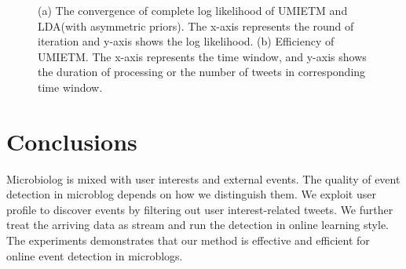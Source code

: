 \documentclass[runningheads,a4paper]{llncs}
\begin{document}
\begin{figure}
        \centering
        \caption{(a) The convergence of complete log likelihood of UMIETM and LDA(with asymmetric priors). The x-axis represents the round of iteration and y-axis shows the log likelihood. (b) Efficiency of UMIETM. The x-axis represents the time window, and y-axis shows the duration of processing or the number of tweets in corresponding time window.}
\end{figure}


\section{Conclusions}
Microbiolog is mixed with user interests and external events.
The quality of event detection in microblog depends on how we distinguish them.
We exploit user profile to discover events by filtering out user interest-related tweets.
We further treat the arriving data as stream and run the detection in online learning style.
The experiments demonstrates that our method is effective and efficient for online event detection in microblogs.






\end{document}

